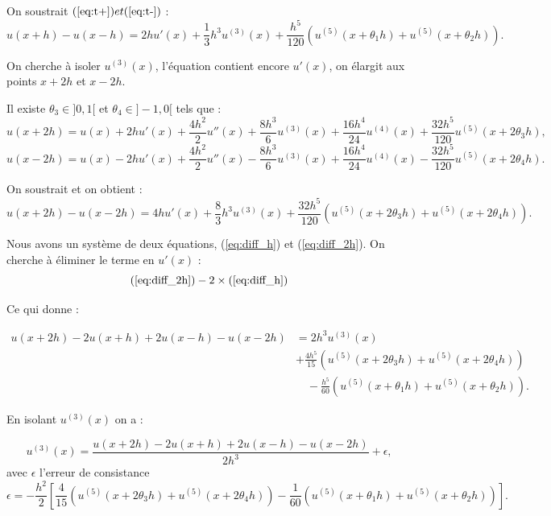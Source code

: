 \documentclass[12pt,a4paper]{article}
\begin{document}
On soustrait $(\ref{eq:t+})  et  (\ref{eq:t-})$ :
\begin{equation}
u(x+h) - u(x-h) = 2h u'(x) + \frac{1}{3}h^3 u^{(3)}(x) + \frac{h^5}{120}\left( u^{(5)}(x+\theta_1 h) + u^{(5)}(x+\theta_2 h) \right). \label{eq:diff_h}
\end{equation}


On cherche à isoler $u^{(3)}(x)$, l'équation contient encore $u'(x)$, on élargit aux points $x+2h$ et $x-2h$. 

Il existe $\theta_3 \in ]0,1[$ et $\theta_4 \in ]-1,0[$ tels que :
\begin{equation}
u(x+2h) = u(x) + 2h u'(x) + \frac{4h^2}{2} u''(x) + \frac{8h^3}{6} u^{(3)}(x) + \frac{16h^4}{24} u^{(4)}(x) + \frac{32h^5}{120} u^{(5)}(x+2\theta_3 h),
\end{equation}
\begin{equation}
u(x-2h) = u(x) - 2h u'(x) + \frac{4h^2}{2} u''(x) - \frac{8h^3}{6} u^{(3)}(x) + \frac{16h^4}{24} u^{(4)}(x) - \frac{32h^5}{120} u^{(5)}(x+2\theta_4 h).
\end{equation}

On soustrait et on obtient :
\begin{equation}
u(x+2h) - u(x-2h) = 4h u'(x) + \frac{8}{3}h^3 u^{(3)}(x) + \frac{32h^5}{120}\left( u^{(5)}(x+2\theta_3 h) + u^{(5)}(x+2\theta_4 h) \right). \label{eq:diff_2h}
\end{equation}

Nous avons un système de deux équations, (\ref{eq:diff_h}) et (\ref{eq:diff_2h}). On cherche à éliminer le terme en $u'(x)$ : 
$$(\ref{eq:diff_2h}) - 2 \times (\ref{eq:diff_h})$$

Ce qui donne  : 

\begin{align*}
u(x+2h) - 2u(x+h) + 2u(x-h) - u(x-2h) &= 2h^3 u^{(3)}(x) \\
& + \frac{4h^5}{15}\left( u^{(5)}(x+2\theta_3 h) + u^{(5)}(x+2\theta_4 h) \right) \\
&\quad - \frac{h^5}{60}\left( u^{(5)}(x+\theta_1 h) + u^{(5)}(x+\theta_2 h) \right).
\end{align*}

En isolant $u^{(3)}(x)$ on a : 

\begin{equation}
u^{(3)}(x) = \frac{u(x+2h) - 2u(x+h) + 2u(x-h) - u(x-2h)}{2h^3} + \epsilon,
\end{equation}
avec $\epsilon$ l'erreur de consistance 
\begin{equation}
\epsilon = - \frac{h^2}{2} \left[ \frac{4}{15}\left( u^{(5)}(x+2\theta_3 h) + u^{(5)}(x+2\theta_4 h) \right) - \frac{1}{60}\left( u^{(5)}(x+\theta_1 h) + u^{(5)}(x+\theta_2 h) \right) \right]. \label{eq:erreur_exacte}
\end{equation}
\end{document}

